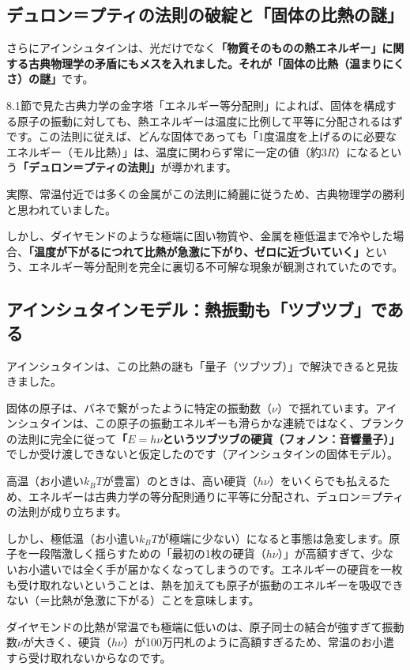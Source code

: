 \subsection{デュロン＝プティの法則の破綻と「固体の比熱の謎」}

さらにアインシュタインは、光だけでなく\textbf{「物質そのものの熱エネルギー」に関する古典物理学の矛盾にもメスを入れました。それが「固体の比熱（温まりにくさ）の謎」}です。

8.1節で見た古典力学の金字塔「エネルギー等分配則」によれば、固体を構成する原子の振動に対しても、熱エネルギーは温度に比例して平等に分配されるはずです。この法則に従えば、どんな固体であっても「1度温度を上げるのに必要なエネルギー（モル比熱）」は、温度に関わらず常に一定の値（約\(3R\)）になるという\textbf{「デュロン＝プティの法則」}が導かれます。

実際、常温付近では多くの金属がこの法則に綺麗に従うため、古典物理学の勝利と思われていました。

しかし、ダイヤモンドのような極端に固い物質や、金属を極低温まで冷やした場合、\textbf{「温度が下がるにつれて比熱が急激に下がり、ゼロに近づいていく」}という、エネルギー等分配則を完全に裏切る不可解な現象が観測されていたのです。

\subsection{アインシュタインモデル：熱振動も「ツブツブ」である}

アインシュタインは、この比熱の謎も「量子（ツブツブ）」で解決できると見抜きました。

固体の原子は、バネで繋がったように特定の振動数（\(\nu\)）で揺れています。アインシュタインは、この原子の振動エネルギーも滑らかな連続ではなく、プランクの法則に完全に従って\textbf{「\(E = h\nu\)というツブツブの硬貨（フォノン：音響量子）」}でしか受け渡しできないと仮定したのです（アインシュタインの固体モデル）。

高温（お小遣い\(k_B T\)が豊富）のときは、高い硬貨（\(h\nu\)）をいくらでも払えるため、エネルギーは古典力学の等分配則通りに平等に分配され、デュロン＝プティの法則が成り立ちます。

しかし、極低温（お小遣い\(k_B T\)が極端に少ない）になると事態は急変します。原子を一段階激しく揺らすための「最初の1枚の硬貨（\(h\nu\)）」が高額すぎて、少ないお小遣いでは全く手が届かなくなってしまうのです。エネルギーの硬貨を一枚も受け取れないということは、熱を加えても原子が振動のエネルギーを吸収できない（＝比熱が急激に下がる）ことを意味します。

ダイヤモンドの比熱が常温でも極端に低いのは、原子同士の結合が強すぎて振動数\(\nu\)が大きく、硬貨（\(h\nu\)）が100万円札のように高額すぎるため、常温のお小遣すら受け取れないからなのです。

